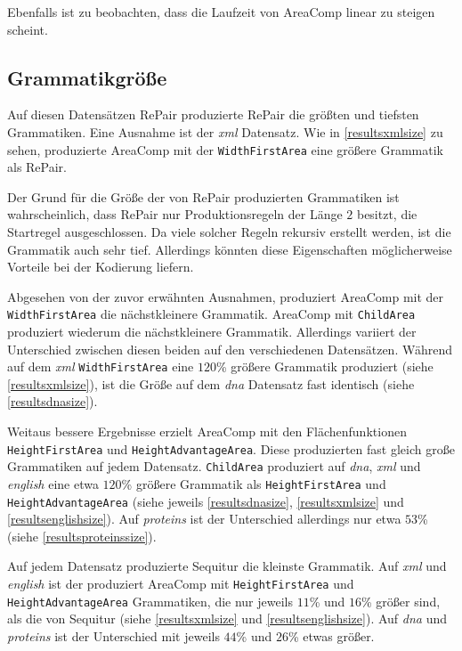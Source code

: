 Ebenfalls ist zu beobachten, dass die Laufzeit von AreaComp linear zu steigen scheint.

\subsection{Grammatikgröße}
\label{grammarsize}

Auf diesen Datensätzen RePair produzierte RePair die größten und tiefsten Grammatiken. Eine Ausnahme ist der \emph{xml} Datensatz. Wie in \autoref{resultsxmlsize} zu sehen, produzierte AreaComp mit der \texttt{WidthFirstArea} eine größere Grammatik als RePair.

Der Grund für die Größe der von RePair produzierten Grammatiken ist wahrscheinlich, dass RePair nur Produktionsregeln der Länge $2$ besitzt, die Startregel ausgeschlossen. Da viele solcher Regeln rekursiv erstellt werden, ist die Grammatik auch sehr tief. Allerdings könnten diese Eigenschaften möglicherweise Vorteile bei der Kodierung liefern.

Abgesehen von der zuvor erwähnten Ausnahmen, produziert AreaComp mit der\\
\texttt{WidthFirstArea} die nächstkleinere Grammatik. AreaComp mit \texttt{ChildArea} produziert wiederum die nächstkleinere Grammatik. Allerdings variiert der Unterschied zwischen diesen beiden auf den verschiedenen Datensätzen. Während auf dem \emph{xml} \texttt{WidthFirstArea} eine $120$\% größere Grammatik produziert (siehe \autoref{resultsxmlsize}), ist die Größe auf dem \emph{dna} Datensatz fast identisch (siehe \autoref{resultsdnasize}).

Weitaus bessere Ergebnisse erzielt AreaComp mit den Flächenfunktionen \\
\texttt{HeightFirstArea} und \texttt{HeightAdvantageArea}.
Diese produzierten fast gleich große Grammatiken auf jedem Datensatz. \texttt{ChildArea} produziert auf \emph{dna}, \emph{xml} und \emph{english} eine etwa $120$\% größere Grammatik als \texttt{HeightFirstArea} und \texttt{HeightAdvantageArea} (siehe jeweils \autoref{resultsdnasize}, \autoref{resultsxmlsize} und \autoref{resultsenglishsize}). Auf \emph{proteins} ist der Unterschied allerdings nur etwa $53$\% (siehe \autoref{resultsproteinssize}).

Auf jedem Datensatz produzierte Sequitur die kleinste Grammatik. Auf \emph{xml} und \emph{english} ist der produziert AreaComp mit \texttt{HeightFirstArea} und \texttt{HeightAdvantageArea} Grammatiken, die nur jeweils $11$\% und $16$\% größer sind, als die von Sequitur (siehe \autoref{resultsxmlsize} und \autoref{resultsenglishsize}).
Auf \emph{dna} und \emph{proteins} ist der Unterschied mit jeweils $44$\% und $26$\% etwas größer.

